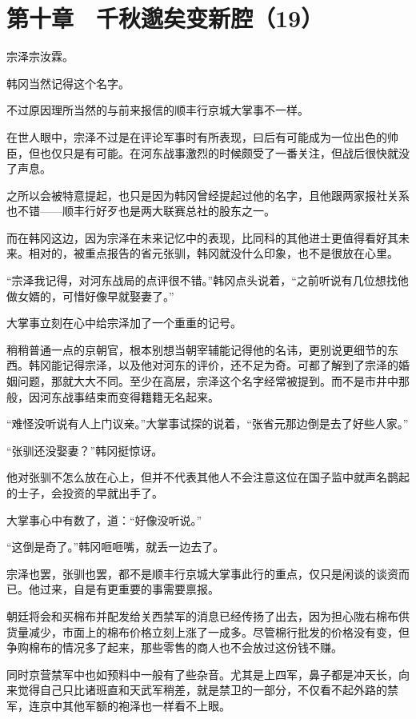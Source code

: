 \section{第十章　千秋邈矣变新腔（19）}

宗泽宗汝霖。

韩冈当然记得这个名字。

不过原因理所当然的与前来报信的顺丰行京城大掌事不一样。

在世人眼中，宗泽不过是在评论军事时有所表现，曰后有可能成为一位出色的帅臣，但也仅只是有可能。在河东战事激烈的时候颇受了一番关注，但战后很快就没了声息。

之所以会被特意提起，也只是因为韩冈曾经提起过他的名字，且他跟两家报社关系也不错——顺丰行好歹也是两大联赛总社的股东之一。

而在韩冈这边，因为宗泽在未来记忆中的表现，比同科的其他进士更值得看好其未来。相对的，被重点报告的省元张驯，韩冈就没什么印象，也不是很放在心里。

“宗泽我记得，对河东战局的点评很不错。”韩冈点头说着，“之前听说有几位想找他做女婿的，可惜好像早就娶妻了。”

大掌事立刻在心中给宗泽加了一个重重的记号。

稍稍普通一点的京朝官，根本别想当朝宰辅能记得他的名讳，更别说更细节的东西。韩冈能记得宗泽，以及他对河东的评价，还不足为奇。可都了解到了宗泽的婚姻问题，那就大大不同。至少在高层，宗泽这个名字经常被提到。而不是市井中那般，因河东战事结束而变得籍籍无名起来。

“难怪没听说有人上门议亲。”大掌事试探的说着，“张省元那边倒是去了好些人家。”

“张驯还没娶妻？”韩冈挺惊讶。

他对张驯不怎么放在心上，但并不代表其他人不会注意这位在国子监中就声名鹊起的士子，会投资的早就出手了。

大掌事心中有数了，道：“好像没听说。”

“这倒是奇了。”韩冈咂咂嘴，就丢一边去了。

宗泽也罢，张驯也罢，都不是顺丰行京城大掌事此行的重点，仅只是闲谈的谈资而已。他过来，自是有更重要的事需要禀报。

朝廷将会和买棉布并配发给关西禁军的消息已经传扬了出去，因为担心陇右棉布供货量减少，市面上的棉布价格立刻上涨了一成多。尽管棉行批发的价格没有变，但争购棉布的情况多了起来，那些零售的商人也不会放过这份钱不赚。

同时京营禁军中也如预料中一般有了些杂音。尤其是上四军，鼻子都是冲天长，向来觉得自己只比诸班直和天武军稍差，就是禁卫的一部分，不仅看不起外路的禁军，连京中其他军额的袍泽也一样看不上眼。

